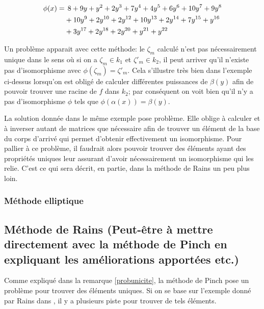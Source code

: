 \documentclass[a4paper]{article} %
\numberwithin{equation}{section}
\begin{document}
\begin{ex}
\begin{align*}
\phi(x) =&\hspace{0.15cm} 8 + 9y + y^2 + 2y^3 + 7y^4 + 4y^5 + 6y^6 + 10y^7 + 9y^8\\
& + 10y^9 + 2y^{10} + 2y^{12} + 10y^{13} + 2y^{14} + 7y^{15} + y^{16}\\
& + 3y^{17} + 2y^{18} + 2y^{20} + y^{21} + y^{22}
\end{align*}


\end{ex}

\begin{rem}
\label{probunicite}
Un problème apparait avec cette méthode: le $\zeta_m$ calculé n'est pas nécessairement unique dans le sens où si on a $\zeta_m\in k_1$ et $\zeta'_m\in k_2$, il peut arriver qu'il n'existe pas d'isomorphisme avec $\phi(\zeta_m) = \zeta'_m$. Cela s'illustre très bien dans l'exemple ci-dessus lorsqu'on est obligé de calculer différentes puissances de $\beta(y)$ afin de pouvoir trouver une racine de $f$ dans $k_2$; par conséquent on voit bien qu'il n'y a pas d'isomorphisme $\phi$ tels que $\phi(\alpha(x)) = \beta(y)$.\par
La solution donnée dans le même exemple pose problème. Elle oblige à calculer et à inverser autant de matrices que nécessaire afin de trouver un élément de la base du corps d'arrivé qui permet d'obtenir effectivement un isomorphisme. Pour pallier à ce problème, il faudrait alors pouvoir trouver des éléments ayant des propriétés uniques leur assurant d'avoir nécessairement un isomorphisme qui les relie. C'est ce qui sera décrit, en partie, dans la méthode de Rains un peu plus loin.
\end{rem}

\subsubsection{Méthode elliptique}

\subsection{Méthode de Rains (Peut-être à mettre directement avec la méthode de Pinch en expliquant les améliorations apportées etc.)}
\label{sectrains}

Comme expliqué dans la remarque \ref{probunicite}, la méthode de Pinch pose un problème pour trouver des éléments uniques. Si on se base sur l'exemple donné par Rains dans \cite{Rai}, il y a plusieurs piste pour trouver de tels éléments.
\end{document}
